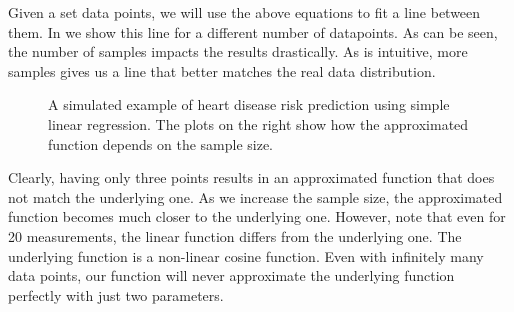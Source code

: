 Given a set data points, we will use the above equations to fit a line between them. In  we show this line for a different number of datapoints. As can be seen, the number of samples impacts the results drastically. As is intuitive, more samples gives us a line that better matches the real data distribution.

\begin{figure}[h!]
 \hfill
 \hfill
 \hfill
 \label{fig:t1-t2-example}
 \caption{A simulated example of heart disease risk prediction using simple linear regression. The plots on the right show how the approximated function depends on the sample size.}
\end{figure}

Clearly, having only three points results in an approximated function that does not match the underlying one. As we increase the sample size, the approximated function becomes much closer to the underlying one. However, note that even for 20 measurements, the linear function differs from the underlying one. The underlying function is a non-linear cosine function. Even with infinitely many data points, our function will never approximate the underlying function perfectly with just two parameters.

